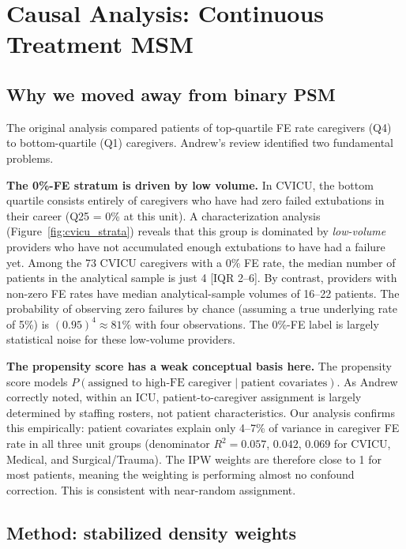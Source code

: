 \documentclass[11pt]{article}
\begin{document}
\section{Causal Analysis: Continuous Treatment MSM}
\label{sec:msm}

\subsection{Why we moved away from binary PSM}

The original analysis compared patients of top-quartile FE rate caregivers
(Q4) to bottom-quartile (Q1) caregivers. Andrew's review identified two
fundamental problems.

\textbf{The 0\%-FE stratum is driven by low volume.} In CVICU, the bottom
quartile consists entirely of caregivers who have had zero failed extubations
in their career (Q25 = 0\% at this unit). A characterization analysis
(Figure~\ref{fig:cvicu_strata}) reveals that this group is dominated by
\emph{low-volume} providers who have not accumulated enough extubations to
have had a failure yet. Among the 73 CVICU caregivers with a 0\% FE rate,
the median number of patients in the analytical sample is just 4 [IQR 2--6].
By contrast, providers with non-zero FE rates have median analytical-sample
volumes of 16--22 patients. The probability of observing zero failures by
chance (assuming a true underlying rate of 5\%) is $(0.95)^4 \approx 81\%$
with four observations. The 0\%-FE label is largely statistical noise for
these low-volume providers.
\label{sec:vol_confound}

\textbf{The propensity score has a weak conceptual basis here.} The
propensity score models $P(\text{assigned to high-FE caregiver} \mid
\text{patient covariates})$. As Andrew correctly noted, within an ICU,
patient-to-caregiver assignment is largely determined by staffing rosters,
not patient characteristics. Our analysis confirms this empirically: patient
covariates explain only 4--7\% of variance in caregiver FE rate in all three
unit groups (denominator $R^2 = 0.057$, $0.042$, $0.069$ for CVICU, Medical,
and Surgical/Trauma). The IPW weights are therefore close to 1 for most
patients, meaning the weighting is performing almost no confound correction.
This is consistent with near-random assignment.

\subsection{Method: stabilized density weights}
\end{document}
